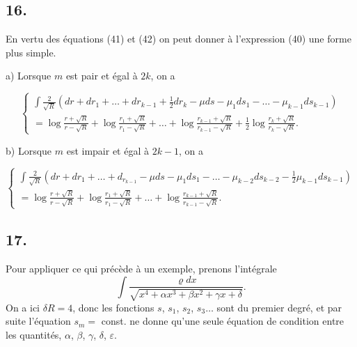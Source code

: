 \documentclass[oneside, 12 pt, leqno]{memoir}
\begin{document}
\subsection*{16.}

En vertu des équations (41) et (42) on peut donner à l'expression (40) une forme plus simple.
\begin{center}a) Lorsque \(m\) est pair et égal à \(2 k\), on a\end{center}
\[\tag{43}\left\{\begin{array}{l}\int \frac{2}{\sqrt{R}}\left(d r+d r_1+\dots+d r_{k-1}+\frac{1}{2} d r_k-\mu d s-\mu_1 d s_1-\dots-\mu_{k-1} d s_{k-1}\right) \\ =\log \frac{r+\sqrt{R}}{r-\sqrt{R}}+\log \frac{r_1+\sqrt{R}}{r_1-\sqrt{R}}+\dots+\log \frac{r_{k-1}+\sqrt{R}}{r_{k-1}-\sqrt{R}}+\frac{1}{2} \log \frac{r_k+\sqrt{R}}{r_k-\sqrt{R}}.\end{array}\right.\]
\begin{center} b) Lorsque \(m\) est impair et égal à \(2 k-1\), on a \end{center}
\[\tag{44} \left\{\begin{array}{c}\int \frac{2}{\sqrt{R}}\left(d r+d r_1+\dots+d_{r_{k-1}}-\mu d s-\mu_1 d s_1-\dots-\mu_{k-2} d s_{k-2}-\frac{1}{2} \mu_{k-1} d s_{k-1}\right) \\ =\log \frac{r+\sqrt{R}}{r-\sqrt{R}}+\log \frac{r_1+\sqrt{R}}{r_1-\sqrt{R}}+\dots+\log \frac{r_{k-1}+\sqrt{R}}{r_{k-1}-\sqrt{R}}.\end{array}\right.\]

\subsection*{17.}

Pour appliquer ce qui précède à un exemple, prenons l'intégrale
\[\int \frac{\varrho d x}{\sqrt{x^4+\alpha x^3+\beta x^2+\gamma x+\delta}}.\]
On a ici \(\delta R=4\), donc les fonctions \(s\), \(s_1\), \(s_2\), \(s_3 \dots\) sont du premier degré, et par suite l'équation \(s_m=\) const. ne donne qu'une seule équation de condition entre les quantités, \(\alpha\), \(\beta\), \(\gamma\), \(\delta\), \(\varepsilon\).
\end{document}

